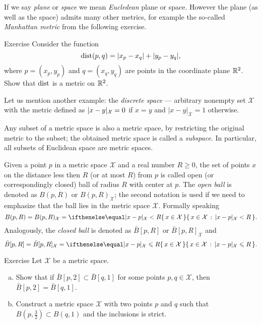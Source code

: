 If we say \emph{plane} or \emph{space} we mean \emph{Eucledean} plane or space.
However the plane (as well as the space) admits many other metrics, for example the so-called \emph{Manhattan metric} from the following exercise.

\begin{thm}{Exercise}
Consider the function
$$\mathop{\rm dist}\nolimits(p,q)=|x_p-x_q|+|y_p-y_q|,$$
where $p=(x_p,y_p)$ and $q=(x_q,y_q)$ are points in the coordinate plane $\mathbb{R}^2$.
Show that $\mathop{\rm dist}\nolimits$ is a metric on $\mathbb{R}^2$.
\end{thm}

Let us mention another example: the \emph{discrete space} --- arbitrary nonempty set $\mathcal X$ with the metric defined as $|x\z-y|_{\mathcal X}=0$ if $x=y$ and $|x-y|_{\mathcal X}=1$ otherwise.

Any subset of a metric space is also a metric space, by restricting the original metric to the subset;
the obtained metric space is called a \emph{subspace}.
In particular, all subsets of Euclidean space are metric spaces.

Given a point $p$ in a metric space ${\mathcal X}$ and a real number $R\ge 0$, the set of points $x$ on the distance less then $R$ (or at most $R$) from $p$ is called open (or correspondingly closed) ball of radius $R$ with center at $p$.
The \emph{open ball} is denoted as $B(p,R)$ or $B(p,R)_{\mathcal X}$;
the second notation is used if we need to emphasize that the ball lies in the metric space $\mathcal X$.
Formally speaking
\[B(p,R)=B(p,R)_{\mathcal X}=\set{x\in \mathcal X}{|x-p|_{\mathcal X}< R}.\]
Analogously, the \emph{closed ball} is denoted as $\bar B[p,R]$ or $\bar B[p,R]_{\mathcal X}$ and
\[\bar B[p,R]=\bar B[p,R]_{\mathcal X}=\set{x\in \mathcal X}{|x-p|_{\mathcal X}\le R}.\]

\begin{thm}{Exercise}\label{ex:B2inB1}
Let $\mathcal X$ be a metric space.
\begin{enumerate}[(a)]
\item Show that if $\bar B[p,2]\subset \bar B[q,1]$
for some points $p,q\in \mathcal X$, then $\bar B[p,2]= \bar B[q,1]$.
\item Construct a metric space $\mathcal X$ with two points $p$ and $q$ such that
$B(p,\tfrac32)\subset B(q,1)$ and the inclusions is strict.
\end{enumerate}

\end{thm}



